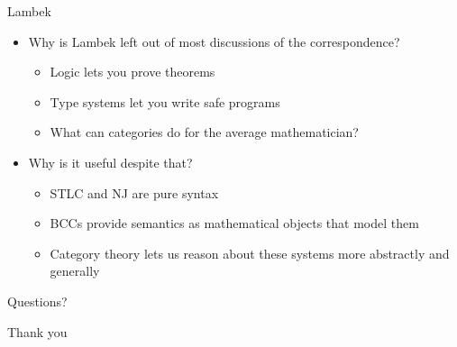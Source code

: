 \documentclass{beamer}
\begin{document}
\begin{frame}{Lambek}
    \begin{itemize}
        \item Why is Lambek left out of most discussions of the correspondence?
        \begin{itemize}
            \item Logic lets you prove theorems
            \item Type systems let you write safe programs
            \item What can categories do for the average mathematician?
        \end{itemize}
        \item Why is it useful despite that?
        \begin{itemize}
            \item STLC and NJ are pure syntax
            \item BCCs provide semantics as mathematical objects that model them
            \item Category theory lets us reason about these systems more abstractly and generally
        \end{itemize}
    \end{itemize}
\end{frame}

\begin{frame}{}
    \begin{center}
        \Huge{Questions?}
    \end{center}
\end{frame}

\begin{frame}{}
    \begin{center}
        \Huge{Thank you}
    \end{center}
\end{frame}
\end{document}
